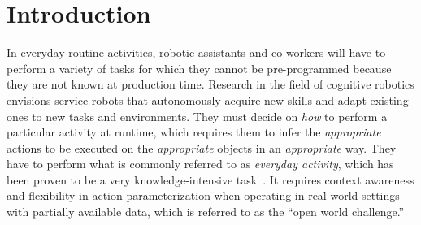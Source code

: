 \documentclass[oribibl]{llncs}
\begin{document}
\section*{Introduction} 

In everyday routine activities, robotic assistants and co-workers 
will have to perform a variety of tasks for which they cannot be 
pre-programmed because they are not known at production time. 
Research in the field of cognitive robotics envisions service 
robots that autonomously acquire new skills and adapt existing ones 
to new tasks and environments. They must decide on \textit{how} to 
perform a particular activity at runtime, which requires them to infer 
the \textit{appropriate} actions to be executed on the \textit 
{appropriate} objects in an \textit{appropriate} way. They have to 
perform what is commonly referred to as \textit{everyday activity}, 
which has been proven to be a very knowledge-intensive task~\cite 
{anderson95phd, nyga12actioncore}. It requires context awareness and 
flexibility in action parameterization when operating in real world 
settings with partially available data, which is referred to as the 
``open world challenge.'' 
\end{document}
